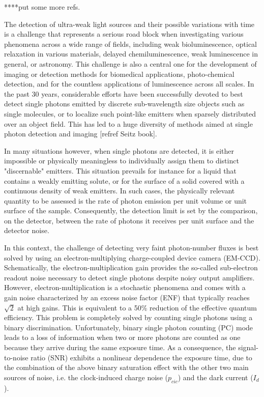 \documentclass{article}
\begin{document}
****put some more refs. 

The detection of ultra-weak light sources and their possible variations with time is a challenge that represents a serious road block when investigating various phenomena across a wide range of fields, including weak bioluminescence, optical relaxation in various materials, delayed chemiluminescence, weak luminescence in general, or astronomy.
This challenge is also a central one for the development of  imaging or detection methods for biomedical applications, photo-chemical detection, and for the countless applications of luminescence across all scales. 
In the past 30 years, considerable efforts have been successfully devoted to best detect single photons emitted by discrete sub-wavelength size objects such as single molecules, or to localize such point-like emitters when sparsely distributed over an object field.
This has led to a huge diversity of methods aimed at single photon detection and imaging [refref Seitz book].

In many situations however, when single photons are detected, it is either impossible or physically meaningless to individually assign them to distinct "discernable" emitters. 
This situation prevails for instance for a liquid that contains a weakly emitting solute, or for the surface of a solid covered with a continuous density of weak emitters. 
In such cases, the physically relevant quantity to be assessed is the rate of photon emission per unit volume or unit surface of the sample.
Consequently, the detection limit is set by the comparison, on the detector, between the rate of photons it receives per unit surface and the detector noise.

In this context, the challenge of detecting very faint photon-number fluxes is best solved by using an electron-multiplying charge-coupled device camera (EM-CCD).
Schematically, the electron-multiplication gain provides the so-called sub-electron readout noise necessary to detect single photons despite noisy output amplifiers.
However, electron-multiplication is a stochastic phenomena and comes with a gain noise characterized by an excess noise factor (ENF) that typically reaches $\sqrt{2}$ at high gains. 
This is equivalent to a 50\% reduction of the effective quantum efficiency.
This problem is completely solved by counting single photons using a binary discrimination.
Unfortunately, binary single photon counting (PC) mode leads to a loss of information when two or more photons are counted as one because they arrive during the same exposure time.
As a consequence, the signal-to-noise ratio (SNR) exhibits a nonlinear dependence the exposure time, due to the combination of the above binary saturation effect with the other two main sources of noise, i.e. the clock-induced charge noise ($p_{cic}$) and the dark current ($I_{d}$).
\end{document}
